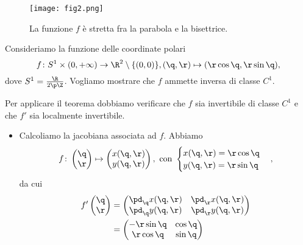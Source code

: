 \begin{figure}[htp]
	\begin{centering}
		\texttt{[image: fig2.png]}
		\caption{La funzione \(f\) è stretta fra la parabola e la bisettrice.}
		\label{fig:invert}
	\end{centering}
\end{figure}

\begin{ese}
	Consideriamo la funzione delle coordinate polari
	\[
		f\colon S^1\times (0,+\infty)\to\R^2\setminus\{(0,0)\},(\q,\r)\mapsto(\r\cos\q,\r\sin\q),
	\]
	dove \(S^1=\frac{\R}{2\p\Z}\).
	Vogliamo mostrare che \(f\) ammette inversa di classe \(C^1\).

	Per applicare il teorema dobbiamo verificare che \(f\) sia invertibile di classe \(C^1\) e che \(f'\) sia localmente invertibile.
	\begin{itemize}
		\item Calcoliamo la jacobiana associata ad \(f\).
		      Abbiamo
		      \[
			      f\colon
			      \begin{pmatrix}
				      \q \\
				      \r
			      \end{pmatrix}
			      \mapsto
			      \begin{pmatrix}
				      x(\q,\r) \\
				      y(\q,\r)
			      \end{pmatrix}
			      ,\text{ con }
			      \begin{cases}
				      x(\q,\r)=\r\cos\q \\
				      y(\q,\r)=\r\sin\q
			      \end{cases}
			      ,
		      \]
		      da cui
		      \[
			      \begin{split}
				      f'
				      \begin{pmatrix}
					      \q \\
					      \r
				      \end{pmatrix}
				      & =
				      \begin{pmatrix}
					      \pd_\q x(\q,\r) & \pd_\r x(\q,\r) \\
					      \pd_\q y(\q,\r) & \pd_\r y(\q,\r)
				      \end{pmatrix}
				      \\
				      & =
				      \begin{pmatrix}
					      -\r\sin\q & \cos\q \\
					      \r\cos\q  & \sin\q
				      \end{pmatrix}

\end{split}\]
\end{itemize}
\end{ese}
